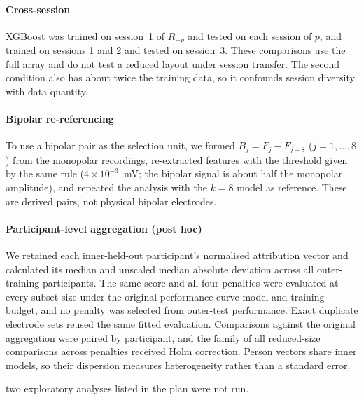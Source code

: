 \paragraph{Cross-session} XGBoost was trained on session~1 of $R_{-p}$ and tested on each session of $p$, and trained on sessions 1 and 2 and tested on session~3. These comparisons use the full array and do not test a reduced layout under session transfer. The second condition also has about twice the training data, so it confounds session diversity with data quantity.

\paragraph{Bipolar re-referencing} To use a bipolar pair as the selection unit, we formed $B_j = F_j - F_{j+8}$ ($j = 1, \ldots, 8$) from the monopolar recordings, re-extracted features with the threshold given by the same rule ($4 \times 10^{-3}$~mV; the bipolar signal is about half the monopolar amplitude), and repeated the analysis with the $k = 8$ model as reference. These are derived pairs, not physical bipolar electrodes.

\paragraph{Participant-level aggregation (post hoc)}  We retained each inner-held-out participant's normalised attribution vector and calculated its median and unscaled median absolute deviation across all outer-training participants. The same score and all four penalties were evaluated at every subset size under the original performance-curve model and training budget, and no penalty was selected from outer-test performance. Exact duplicate electrode sets reused the same fitted evaluation. Comparisons against the original aggregation were paired by participant, and the family of all reduced-size comparisons across penalties received Holm correction. Person vectors share inner models, so their dispersion measures heterogeneity rather than a standard error.

 two exploratory analyses listed in the plan were not run. 
